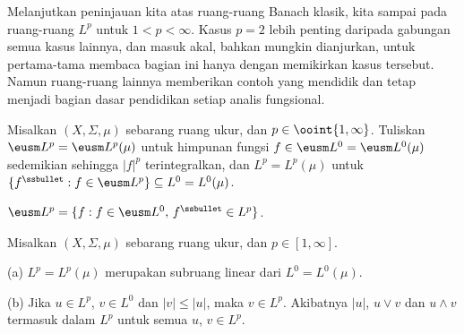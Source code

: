 
\def\chaptername{Ruang fungsi}
\def\sectionname{$L^{p}$}


Melanjutkan peninjauan kita atas ruang-ruang Banach klasik, kita sampai
pada ruang-ruang $L^p$ untuk $1<p<\infty$. Kasus $p=2$ lebih penting
daripada gabungan semua kasus lainnya, dan masuk akal, bahkan mungkin
dianjurkan, untuk pertama-tama membaca bagian ini hanya dengan memikirkan
kasus tersebut. Namun ruang-ruang lainnya memberikan contoh yang
mendidik dan tetap menjadi bagian dasar pendidikan setiap analis
fungsional.

Misalkan $(X,\Sigma,\mu)$ sebarang ruang ukur, dan
$p\in\ooint{1,\infty}$. Tuliskan $\eusm L^p=\eusm L^p(\mu)$ untuk
himpunan fungsi $f\in\eusm L^0=\eusm L^0(\mu)$ sedemikian sehingga
$|f|^p$ terintegralkan, dan $L^p=L^p(\mu)$ untuk
$\{f^{\ssbullet}:f\in\eusm L^p\}\subseteq L^0=L^0(\mu)$.

$\eusm L^p=\{f:f\in\eusm L^0,\,f^{\ssbullet}\in L^p\}$.


 Misalkan $(X,\Sigma,\mu)$ sebarang ruang ukur,
dan $p\in[1,\infty]$.

(a) $L^p=L^p(\mu)$ merupakan subruang linear dari $L^0=L^0(\mu)$.

(b) Jika $u\in L^p$, $v\in L^0$ dan $|v|\le |u|$, maka $v\in L^p$.
Akibatnya $|u|$, $u\vee v$ dan $u\wedge v$ termasuk dalam $L^p$ untuk
semua $u$, $v\in L^p$.

